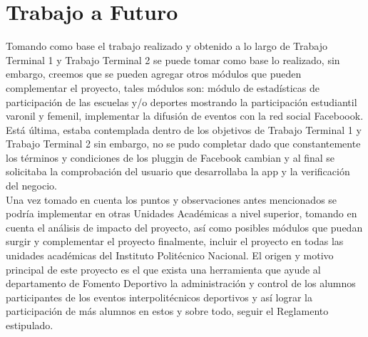 \chapter*{Trabajo a Futuro}
{}
	\noindent Tomando como base el trabajo realizado y obtenido a lo largo de Trabajo Terminal 1 y Trabajo Terminal 2 se puede tomar como base lo realizado, sin embargo, creemos que se pueden agregar otros módulos que pueden complementar el proyecto, tales módulos son: módulo de estadísticas de participación de las escuelas y/o deportes mostrando la participación estudiantil varonil y femenil, implementar la difusión de eventos con la red social Faceboook. Está última, estaba contemplada dentro de los objetivos de Trabajo Terminal 1 y Trabajo Terminal 2 sin embargo, no se pudo completar dado que constantemente los términos y condiciones de los pluggin de Facebook cambian y al final se solicitaba la comprobación del usuario que desarrollaba la app y la verificación del negocio. \\
	
	\noindent Una vez tomado en cuenta los puntos y observaciones antes mencionados se podría implementar en otras Unidades Académicas a nivel superior, tomando en cuenta el análisis de impacto del proyecto, así como posibles módulos que puedan surgir y complementar el proyecto finalmente, incluir el proyecto en todas las unidades académicas del Instituto Politécnico Nacional. El origen y motivo principal de este proyecto es el que exista una herramienta que ayude al departamento de Fomento Deportivo la administración y control de los alumnos participantes de los eventos interpolitécnicos deportivos y así lograr la participación de más alumnos en estos y sobre todo, seguir el Reglamento estipulado. \\
	
	